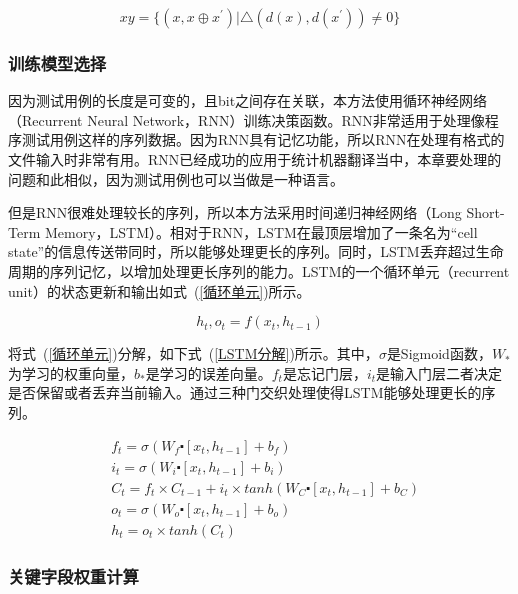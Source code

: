 \begin{equation}\label{训练集}
xy = \{(x, x \oplus x^{'}) | \bigtriangleup (d(x),d(x^{'})) \neq 0 \}
\end{equation}

\subsubsection{训练模型选择}

因为测试用例的长度是可变的，且bit之间存在关联，本方法使用循环神经网络（Recurrent Neural Network，RNN）训练决策函数。RNN非常适用于处理像程序测试用例这样的序列数据。因为RNN具有记忆功能，所以RNN在处理有格式的文件输入时非常有用。RNN已经成功的应用于统计机器翻译当中，本章要处理的问题和此相似，因为测试用例也可以当做是一种语言。

但是RNN很难处理较长的序列，所以本方法采用时间递归神经网络（Long Short-Term Memory，LSTM）。相对于RNN，LSTM在最顶层增加了一条名为“cell state”的信息传送带同时，所以能够处理更长的序列。同时，LSTM丢弃超过生命周期的序列记忆，以增加处理更长序列的能力。LSTM的一个循环单元（recurrent unit）的状态更新和输出如式~(\ref{循环单元})所示。

\begin{equation}\label{循环单元}
h_{t}, o_{t} = f(x_{t},h_{t-1})
\end{equation}

将式~(\ref{循环单元})分解，如下式~(\ref{LSTM分解})所示。其中，$\sigma$是Sigmoid函数，$W_{*}$为学习的权重向量，$b_{*}$是学习的误差向量。$f_t$是忘记门层，$i_t$是输入门层二者决定是否保留或者丢弃当前输入。通过三种门交织处理使得LSTM能够处理更长的序列。

\begin{equation}\label{LSTM分解}
\begin{aligned}
& f_{t} = \sigma(W_{f} \centerdot [x_{t}, h_{t-1}] + b_f) \\
& i_t = \sigma (W_{i} \centerdot [x_{t}, h_{t-1}] + b_{i}) \\
& C_{t} = f_{t} \times C_{t-1} + i_{t} \times tanh(W_C \centerdot [x_{t}, h_{t-1}] + b_{C}) \\
& o_t = \sigma(W_{o} \centerdot [x_{t}, h_{t-1}] + b_{o}) \\
& h_{t} = o_{t} \times tanh(C_{t})
\end{aligned}
\end{equation}

\subsubsection{关键字段权重计算}
\label{关键字段权重计算}

